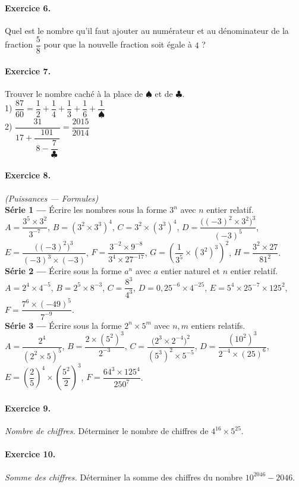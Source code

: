 \documentclass[12pt]{article}
\newenvironment{exercice}[1]{\paragraph{Exercice #1.}}{}
\begin{document}
\begin{exercice}{6}
Quel est le nombre qu’il faut ajouter au numérateur et au dénominateur de la fraction $\dfrac{5}{8}$ pour que la nouvelle fraction soit égale à $4$ ?
\end{exercice}

\begin{exercice}{7}
Trouver le nombre caché à la place de $\spadesuit$ et de $\clubsuit$.\\
1)\; $\dfrac{87}{60}=\dfrac{1}{2}+\dfrac{1}{4}+\dfrac{1}{3}+\dfrac{1}{6}+\dfrac{1}{\spadesuit}$\\
2)\; $\dfrac{31}{17+\dfrac{101}{\,8-\dfrac{7}{\clubsuit}\,}}=\dfrac{2015}{2014}$
\end{exercice} 

\begin{exercice}{8} \textit{(Puissances — Formules)}\\
\textbf{Série 1 —} Écrire les nombres sous la forme $3^{n}$ avec $n$ entier relatif.\\
$A=\dfrac{3^{5}\times 3^{2}}{3^{-7}}$,\;
$B=(3^{2}\times 3^{3})^{4}$,\;
$C=3^{2}\times (3^{3})^{4}$,\;
$D=\dfrac{\big(({-}3)^{2}\times 3^{2}\big)^{3}}{(-3)^{5}}$,\;
$E=\dfrac{\big(({-}3)^{2}\big)^{3}}{(-3)^{3}\times(-3)}$,\;
$F=\dfrac{3^{-2}\times 9^{-8}}{3^{4}\times 27^{-17}}$,\;
$G=\left(\dfrac{1}{3^{5}}\times (3^{2})^{3}\right)^{2}$,\;
$H=\dfrac{3^{2}\times 27}{81^{2}}$.\\[0.4em]
\textbf{Série 2 —} Écrire sous la forme $a^{n}$ avec $a$ entier naturel et $n$ entier relatif.\\
$A=2^{4}\times 4^{-5}$,\;
$B=2^{5}\times 8^{-3}$,\;
$C=\dfrac{8^{3}}{4^{3}}$,\;
$D=0{,}25^{-6}\times 4^{-25}$,\;
$E=5^{4}\times 25^{-7}\times 125^{2}$,\;
$F=\dfrac{7^{6}\times(-49)^{5}}{7^{-9}}$.\\[0.4em]
\textbf{Série 3 —} Écrire sous la forme $2^{n}\times 5^{m}$ avec $n,m$ entiers relatifs.\\
$A=\dfrac{2^{4}}{(2^{2}\times 5)^{5}}$,\;
$B=\dfrac{2\times (5^{2})^{3}}{2^{-3}}$,\;
$C=\dfrac{\big(2^{3}\times 2^{-4}\big)^{2}}{(5^{3})^{2}\times 5^{-5}}$,\;
$D=\dfrac{(10^{2})^{3}}{2^{-4}\times (25)^{6}}$,\;
$E=\left(\dfrac{2}{5}\right)^{4}\times\left(\dfrac{5^{2}}{2}\right)^{3}$,\;
$F=\dfrac{64^{3}\times 125^{4}}{250^{7}}$.
\end{exercice} 

\begin{exercice}{9}
\textit{Nombre de chiffres.} Déterminer le nombre de chiffres de $4^{16}\times 5^{25}$.
\end{exercice} 

\begin{exercice}{10}
\textit{Somme des chiffres.} Déterminer la somme des chiffres du nombre $10^{2046}-2046$.
\end{exercice} 
\end{document}
